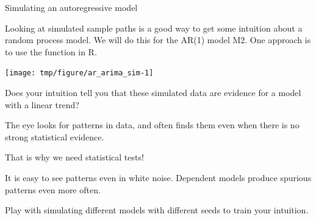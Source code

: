\begin{frame}[fragile]{Simulating an autoregressive model}


Looking at simulated sample paths is a good way to get some intuition about a random process model. 
We will do this for the AR(1) model M2.
One approach is to use the  function in R.


\begin{knitrout}\small
{}\color{fgcolor}\begin{kframe}
\begin{alltt}
\hlstd{(}\hlstd{)}
 \hlkwb{<-} \hlstd{(}\hlstd{(}\hlstd{=}\hlstd{),}\hlstd{=}\hlstd{,}\hlstd{=}\hlstd{)}
\hlstd{=}\hlstd{)}
\end{alltt}
\end{kframe}
\end{knitrout}


\begin{knitrout}\small
{}\color{fgcolor}

{\centering \texttt{[image: tmp/figure/ar\_arima\_sim-1]} 

}


\end{knitrout}

\end{frame}

\begin{frame}[fragile]
\bi

\item Does your intuition tell you that these simulated data are evidence for a model with a linear trend?

\item The eye looks for patterns in data, and often finds them even when there is no strong statistical evidence. 

\item That is why we need statistical tests!

\item It is easy to see patterns even in white noise. Dependent models produce spurious patterns even more often.

\item Play with simulating different models with different seeds to train your intuition.

\ei

\end{frame}

